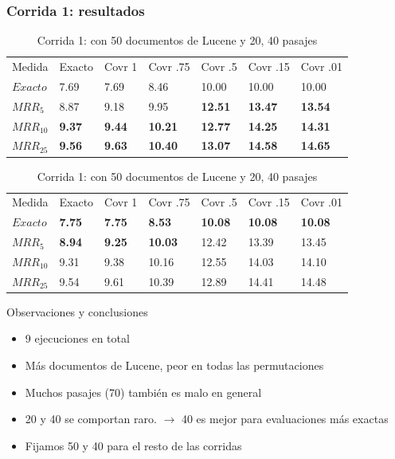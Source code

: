 \begin{frame}
\frametitle{Corrida 1: resultados}

\begin{table}
\centering
\begin{center}
\begin{tabular}{|l | l | l | l | l | l | l |}

Medida & Exacto & Covr 1 & Covr .75 & Covr .5 & Covr .15 & Covr .01 \\ 
$Exacto$ & 7.69 & 7.69 & 8.46 & 10.00 & 10.00 & 10.00  \\ 
$MRR_{5}$ & 8.87 & 9.18 & 9.95 & \textbf{12.51} & \textbf{13.47} & \textbf{13.54}  \\ 
$MRR_{10}$ & \textbf{9.37} & \textbf{9.44} & \textbf{10.21} & \textbf{12.77} & \textbf{14.25} & \textbf{14.31}  \\ 
$MRR_{25}$ & \textbf{9.56} & \textbf{9.63} & \textbf{10.40} & \textbf{13.07} & \textbf{14.58} & \textbf{14.65}  \\ 
\end{tabular}

\medskip
\medskip

\begin{tabular}{|l | l | l | l | l | l | l |}
Medida & Exacto & Covr 1 & Covr .75 & Covr .5 & Covr .15 & Covr .01 \\ 
$Exacto$ & \textbf{7.75} & \textbf{7.75} & \textbf{8.53} & \textbf{10.08} & \textbf{10.08} & \textbf{10.08}  \\ 
$MRR_{5}$ & \textbf{8.94} & \textbf{9.25} & \textbf{10.03} & 12.42 & 13.39 & 13.45  \\ 
$MRR_{10}$ & 9.31 & 9.38 & 10.16 & 12.55 & 14.03 & 14.10  \\ 
$MRR_{25}$ & 9.54 & 9.61 & 10.39 & 12.89 & 14.41 & 14.48  \\ 
\end{tabular}
\caption{Corrida 1: con 50 documentos de Lucene y 20, 40 pasajes}
\end{center}
\end{table}

Observaciones y conclusiones
\begin{itemize}
  \item 9 ejecuciones en total
  \item Más documentos de Lucene, peor en todas las permutaciones
  \item Muchos pasajes (70) también es malo en general
  \item 20 y 40 se comportan raro. $\rightarrow$ 40 es mejor para evaluaciones más exactas
  \item Fijamos 50 y 40 para el resto de las corridas
\end{itemize}

\end{frame}


